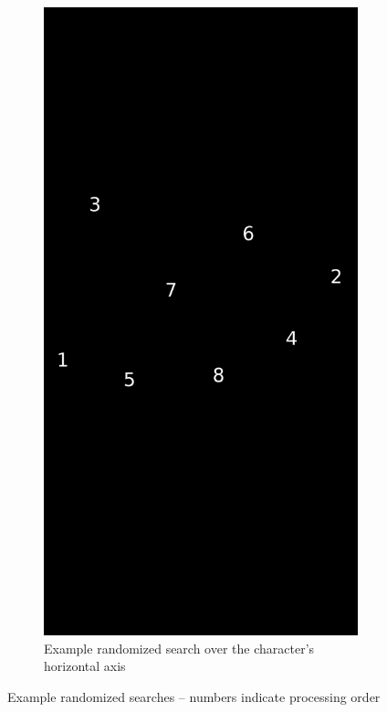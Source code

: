 \documentclass[11pt]{article}
\begin{document}
\begin{figure}[htb]
\begin{subfigure}[htb]{0.33\textwidth}
  \end{subfigure}
  \hspace{0.12\textwidth}
  \begin{subfigure}[htb]{0.33\textwidth}
    \includegraphics[width=\textwidth]{resources/width_search}
    \caption{Example randomized search over the character's horizontal axis}
  \end{subfigure}
  \caption{Example randomized searches -- numbers indicate processing order}
  \label{fig:ray_sample_run}
\end{figure}
\end{document}
